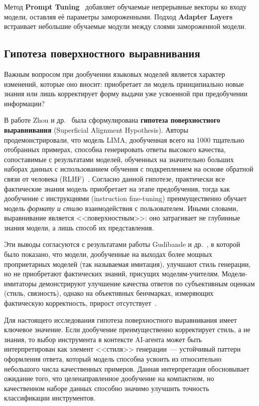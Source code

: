 Метод \textbf{Prompt Tuning}~\cite{lester2021power} добавляет обучаемые непрерывные векторы ко входу модели, оставляя её параметры замороженными. Подход \textbf{Adapter Layers}~\cite{houlsby2019parameter} встраивает небольшие обучаемые модули между слоями замороженной модели.

\subsection{Гипотеза поверхностного выравнивания}

Важным вопросом при дообучении языковых моделей является характер изменений, которые оно вносит: приобретает ли модель принципиально новые знания или лишь корректирует форму выдачи уже усвоенной при предобучении информации?

В работе Zhou и др.~\cite{zhou2023lima} была сформулирована \textbf{гипотеза поверхностного выравнивания} (Superficial Alignment Hypothesis). Авторы продемонстрировали, что модель LIMA, дообученная всего на 1000 тщательно отобранных примерах, способна генерировать ответы высокого качества, сопоставимые с результатами моделей, обученных на значительно больших наборах данных с использованием обучения с подкреплением на основе обратной связи от человека (RLHF)~\cite{ouyang2022instructgpt}. Согласно данной гипотезе, практически все фактические знания модель приобретает на этапе предобучения, тогда как дообучение с инструкциями (instruction fine-tuning) преимущественно обучает модель \textit{формату и стилю} взаимодействия с пользователем. Иными словами, выравнивание является <<поверхностным>>: оно затрагивает не глубинные знания модели, а лишь способ их представления.

Эти выводы согласуются с результатами работы Gudibande и др.~\cite{gudibande2023false}, в которой было показано, что модели, дообученные на выходах более мощных проприетарных моделей (так называемая имитация), улучшают стиль генерации, но не приобретают фактических знаний, присущих моделям-учителям. Модели-имитаторы демонстрируют улучшение качества ответов по субъективным оценкам (стиль, связность), однако на объективных бенчмарках, измеряющих фактическую корректность, прирост отсутствует~\cite{gudibande2023false}.

Для настоящего исследования гипотеза поверхностного выравнивания имеет ключевое значение. Если дообучение преимущественно корректирует стиль, а не знания, то выбор инструмента в контексте AI-агента может быть интерпретирован как элемент <<стиля>> генерации~--- устойчивый паттерн оформления ответа, который модель способна усвоить из относительно небольшого числа качественных примеров. Данная интерпретация обосновывает ожидание того, что целенаправленное дообучение на компактном, но качественном наборе данных способно значимо улучшить точность классификации инструментов.

